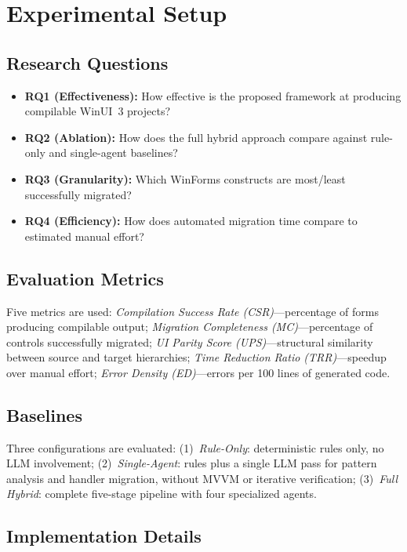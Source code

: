 \documentclass[conference]{IEEEtran}
\begin{document}
\section{Experimental Setup}

\subsection{Research Questions}

\begin{itemize}
    \item \textbf{RQ1 (Effectiveness):} How effective is the proposed framework at producing compilable WinUI~3 projects?
    \item \textbf{RQ2 (Ablation):} How does the full hybrid approach compare against rule-only and single-agent baselines?
    \item \textbf{RQ3 (Granularity):} Which WinForms constructs are most/least successfully migrated?
    \item \textbf{RQ4 (Efficiency):} How does automated migration time compare to estimated manual effort?
\end{itemize}

\subsection{Evaluation Metrics}

Five metrics are used: \textit{Compilation Success Rate (CSR)}---percentage of forms producing compilable output; \textit{Migration Completeness (MC)}---percentage of controls successfully migrated; \textit{UI Parity Score (UPS)}---structural similarity between source and target hierarchies; \textit{Time Reduction Ratio (TRR)}---speedup over manual effort; \textit{Error Density (ED)}---errors per 100 lines of generated code.

\subsection{Baselines}

Three configurations are evaluated: (1)~\textit{Rule-Only}: deterministic rules only, no LLM involvement; (2)~\textit{Single-Agent}: rules plus a single LLM pass for pattern analysis and handler migration, without MVVM or iterative verification; (3)~\textit{Full Hybrid}: complete five-stage pipeline with four specialized agents.

\subsection{Implementation Details}
\end{document}
